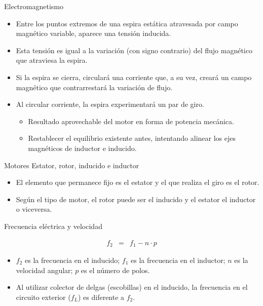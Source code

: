 \documentclass[xcolor={usenames,svgnames,dvipsnames}]{beamer}
\begin{document}
\begin{frame}[label=sec-2-1-2]{Electromagnetismo}
\begin{itemize}
\item Entre los puntos extremos de una \alert{espira} estática atravesada por
\alert{campo magnético variable}, aparece una \alert{tensión inducida}.

\item Esta tensión es igual a la \alert{variación} (con signo contrario) \alert{del
flujo magnético} que atraviesa la espira.

\item Si la espira se cierra, \alert{circulará una corriente} que, a su vez,
creará un campo magnético que contrarrestará la variación de flujo.

\item Al circular corriente, la espira experimentará un \alert{par de giro}.

\begin{itemize}
\item \alert{Resultado aprovechable} del motor en forma de potencia mecánica.

\item Restablecer el equilibrio existente antes, intentando \alert{alinear los
ejes magnéticos de inductor e inducido}.
\end{itemize}
\end{itemize}
\end{frame}



\begin{frame}[label=sec-2-1-3]{Motores}
Estator, rotor, inducido e inductor

\begin{itemize}
\item El elemento que permanece fijo es el estator y el que realiza el giro
es el rotor.

\item Según el tipo de motor, el rotor puede ser el inducido y el estator
el inductor o viceversa.
\end{itemize}

Frecuencia eléctrica y velocidad

$$\begin{aligned}
f_{2} & = & f_{1}-n\cdot p\end{aligned}$$

\begin{itemize}
\item $f_{2}$ es la frecuencia en el inducido; $f_{1}$ es la frecuencia en
el inductor; $n$ es la velocidad angular; $p$ es el número de polos.

\item Al utilizar colector de delgas (escobillas) en el inducido, la
frecuencia en el circuito exterior ($f_{L}$) es diferente a $f_{2}$.
\end{itemize}
\end{frame}
\end{document}
